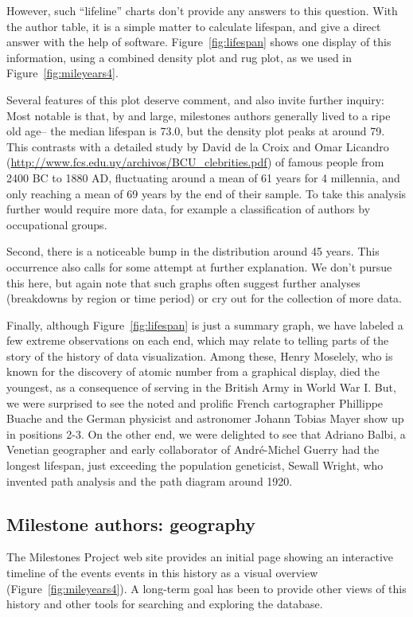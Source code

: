 \documentclass[11pt]{article}
\newcommand*{\figref}[1]{Figure~\ref{#1}}
\begin{document}
However, such ``lifeline'' charts don't provide any answers to this question.  With the
author table, it is a simple matter to calculate lifespan, and give a direct answer
with the help of software.  \figref{fig:lifespan} shows one display of this information,
using a combined density plot and rug plot, as we used in \figref{fig:mileyears4}.

Several features of this plot deserve comment, and also invite further inquiry:
Most notable is that, by and large, milestones authors generally lived to a ripe old age--
the median lifespan is 73.0, but the density plot peaks at around 79.
This contrasts with a detailed study by
David de la Croix and Omar Licandro (\url{http://www.fcs.edu.uy/archivos/BCU_clebrities.pdf})
of famous people from 2400 BC to 1880 AD,
fluctuating around a mean of 61 years for 4 millennia, and only reaching a mean of 69 years
by the end of their sample. To take this analysis further would require more data, for example
a classification of authors by occupational groups.

Second, there is a noticeable bump in the distribution around 45 years. This
occurrence also calls for some attempt at further explanation.
We don't pursue this here, but again note that such graphs often suggest
further analyses (breakdowns by region or time period)
or cry out for the collection of more data.

Finally, although \figref{fig:lifespan} is just a summary graph, we have labeled a few
extreme observations on each end, which may relate to telling parts of the story of the
history of data visualization.  Among these, Henry Moselely, who is known for the
discovery of atomic number from a graphical display, died the youngest, as a consequence
of serving in the British Army in World War I. But, we were surprised to see
the noted and prolific French cartographer Phillippe Buache
and the German physicist and astronomer Johann Tobias Mayer show up in positions
2-3.  On the other end, we were delighted to see that Adriano Balbi,
a Venetian geographer and early collaborator of Andr{\'e}-Michel Guerry
\citep{BalbiGuerry:1829} had the longest lifespan,
just exceeding the population geneticist, Sewall Wright, who invented
path analysis and the path diagram around 1920.

\subsection{Milestone authors: geography}\label{sec:geography}
The Milestones Project web site provides an initial page showing an interactive timeline
of the events events in this history as a visual overview (\figref{fig:mileyears4}).
A long-term goal has been to
provide other views of this history and other tools for searching and exploring the
database.
\end{document}
